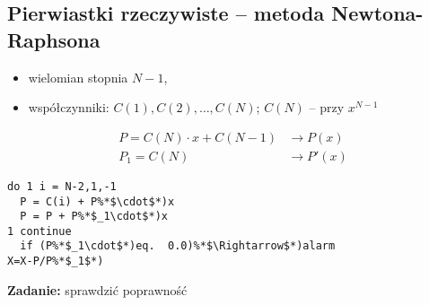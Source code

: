\subsection{Pierwiastki rzeczywiste -- metoda Newtona-Raphsona}

\begin{frame}
  \begin{itemize}
    \item wielomian stopnia $N-1$,
    \item współczynniki: $C(1), C(2), \dots, C(N)$; $C(N)$ -- przy $x^{N-1}$
  \end{itemize}

  $$\begin{array}{ll}
  P = C(N) \cdot x + C(N-1) & \rightarrow P(x) \\
  P_1 = C(N) & \rightarrow P'(x)
  \end{array}$$
\end{frame}

\begin{frame}[fragile]
  \begin{lstlisting}[frame=single]
do 1 i = N-2,1,-1
  P = C(i) + P%*$\cdot$*)x
  P = P + P%*$_1\cdot$*)x
1 continue
  if (P%*$_1\cdot$*)eq.  0.0)%*$\Rightarrow$*)alarm
X=X-P/P%*$_1$*)
\end{lstlisting}

  \textbf{Zadanie:} sprawdzić poprawność
\end{frame}

